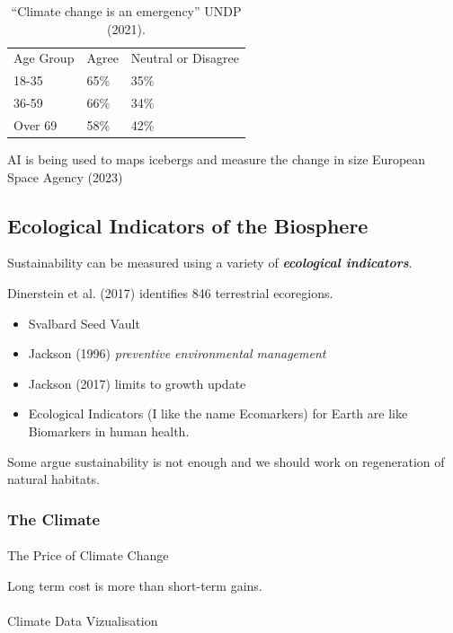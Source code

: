 \documentclass[
  letterpaper,
  DIV=11,
  numbers=noendperiod]{scrartcl}
\makeatletter
\let\oldparagraph\paragraph
\renewcommand{\paragraph}{
    \@ifstar
      \xxxParagraphStar
      \xxxParagraphNoStar
  }
\newcommand{\xxxParagraphStar}[1]{\oldparagraph*{#1}\mbox{}}
\newcommand{\xxxParagraphNoStar}[1]{\oldparagraph{#1}\mbox{}}
\providecommand{\tightlist}{%
  \setlength{\itemsep}{0pt}\setlength{\parskip}{0pt}}\usepackage{longtable,booktabs,array}
\makeatother
\begin{document}
\begin{longtable}[]{@{}lll@{}}
\caption{``Climate change is an emergency'' UNDP (2021).}\tabularnewline
\toprule\noalign{}
\endfirsthead
\endhead
\bottomrule\noalign{}
\endlastfoot
Age Group & Agree & Neutral or Disagree \\
18-35 & 65\% & 35\% \\
36-59 & 66\% & 34\% \\
Over 69 & 58\% & 42\% \\
\end{longtable}

AI is being used to maps icebergs and measure the change in size
European Space Agency (2023)

\subsection{Ecological Indicators of the
Biosphere}\label{ecological-indicators-of-the-biosphere}

Sustainability can be measured using a variety of
\textbf{\emph{ecological indicators}}.

Dinerstein et al. (2017) identifies 846 terrestrial ecoregions.

\begin{itemize}
\tightlist
\item
  Svalbard Seed Vault
\item
  Jackson (1996) \emph{preventive environmental management}
\item
  Jackson (2017) limits to growth update
\item
  Ecological Indicators (I like the name Ecomarkers) for Earth are like
  Biomarkers in human health.
\end{itemize}

Some argue sustainability is not enough and we should work on
regeneration of natural habitats.

\subsubsection{The Climate}\label{the-climate}

\paragraph{The Price of Climate
Change}\label{the-price-of-climate-change}

Long term cost is more than short-term gains.

\paragraph{Climate Data Vizualisation}\label{climate-data-vizualisation}
\end{document}
